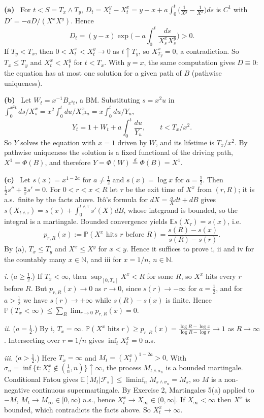 \documentclass[11pt,a4paper]{article}
\newcommand{\E}{\mathbb{E}}
\renewcommand{\P}{\mathbb{P}}
\newcommand{\N}{\mathbb{N}}
\newcommand{\F}{\mathcal{F}}
\newcommand{\1}{\mathbf{1}}
\newcommand{\sub}[1]{\par\smallskip\noindent\textbf{#1}\ }
\begin{document}
\sub{(a)} For $t<S=T_x\wedge T_y$, $D_t=X^y_t-X^x_t=y-x+a\int_0^t\big(\frac1{X^y}-\frac1{X^x}\big)ds$ is $C^1$
with $D'=-aD/(X^xX^y)$. Hence
\[D_t=(y-x)\exp\Big(-a\int_0^t\frac{ds}{X^x_sX^y_s}\Big)>0 .\]
If $T_y<T_x$, then $0<X^x_t<X^y_t\to0$ as $t\uparrow T_y$, so $X^x_{T_y}=0$, a contradiction. So $T_x\le T_y$ and
$X^x_t<X^y_t$ for $t<T_x$. With $y=x$, the same computation gives $D\equiv0$: the equation has at most one
solution for a given path of $B$ (pathwise uniqueness).

\sub{(b)} Let $W_t=x^{-1}B_{x^2t}$, a BM. Substituting $s=x^2u$ in
$\int_0^{x^2t}ds/X^x_s=x^2\int_0^tdu/X^x_{x^2u}=x\int_0^tdu/Y_u$,
\[
Y_t=1+W_t+a\int_0^t\frac{du}{Y_u},\qquad t<T_x/x^2 .
\]
So $Y$ solves the equation with $x=1$ driven by $W$, and its lifetime is $T_x/x^2$. By pathwise uniqueness the solution is
a fixed functional of the driving path, $X^1=\Phi(B)$, and therefore $Y=\Phi(W)\overset d=\Phi(B)=X^1$.

\sub{(c)} Let $s(x)=x^{1-2a}$ for $a\ne\frac12$ and $s(x)=\log x$ for $a=\frac12$. Then $\frac12s''+\frac ax s'=0$. For
$0<r<x<R$ let $\tau$ be the exit time of $X^x$ from $(r,R)$; it is a.s.\ finite by the facts above. Itô's
formula for $dX=\frac a Xdt+dB$ gives $s(X_{t\wedge\tau})=s(x)+\int_0^{t\wedge\tau}s'(X)dB$, whose integrand is bounded,
so the integral is a martingale. Bounded convergence yields $\E s(X_\tau)=s(x)$, i.e.\
\[
p_{r,R}(x):=\P(X^x\text{ hits }r\text{ before }R)=\frac{s(R)-s(x)}{s(R)-s(r)} .
\]
By (a), $T_x\le T_y$ and $X^x\le X^y$ for $x<y$. Hence it suffices to prove i, ii and iv for the countably many $x\in\N$,
and iii for $x=1/n$, $n\in\N$.

\emph{i.} ($a\ge\frac12$.) If $T_x<\infty$, then $\sup_{[0,T_x]}X^x<R$ for some $R$, so $X^x$ hits every $r$ before $R$. But
$p_{r,R}(x)\to0$ as $r\to0$, since $s(r)\to-\infty$ for $a=\frac12$, and for $a>\frac12$ we have $s(r)\to+\infty$ while
$s(R)-s(x)$ is finite. Hence $\P(T_x<\infty)\le\sum_R\lim_{r\to0}p_{r,R}(x)=0$.

\emph{ii.} ($a=\frac12$.) By i, $T_x=\infty$. $\P(X^x\text{ hits }r)\ge p_{r,R}(x)=\frac{\log R-\log x}{\log R-\log r}\to1$ as
$R\to\infty$. Intersecting over $r=1/n$ gives $\inf_tX^x_t=0$ a.s.

\emph{iii.} ($a>\frac12$.) Here $T_x=\infty$ and $M_t=(X^x_t)^{1-2a}>0$. With
$\sigma_n=\inf\{t:X^x_t\notin(\frac1n,n)\}\uparrow\infty$, the process $M_{t\wedge\sigma_n}$ is a bounded martingale. Conditional
Fatou gives $\E[M_t|\F_s]\le\liminf_n M_{s\wedge\sigma_n}=M_s$, so $M$ is a non-negative continuous supermartingale. By
Exercise 2, Martingales 5(a) applied to $-M$, $M_t\to M_\infty\in[0,\infty)$ a.s., hence $X^x_t\to X_\infty\in(0,\infty]$.
If $X_\infty<\infty$ then $X^x$ is bounded, which contradicts the facts above. So $X^x_t\to\infty$.
\end{document}
